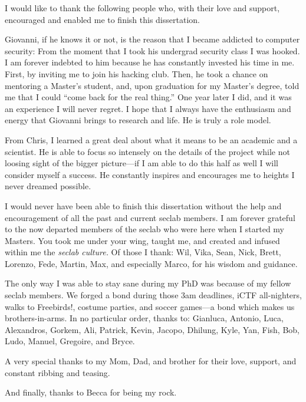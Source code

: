 \begin{acknowledgements}

I would like to thank the following people who, with their love and
support, encouraged and enabled me to finish this dissertation.

Giovanni, if he knows it or not, is the reason that I became addicted
to computer security: From the moment that I took his undergrad
security class I was hooked. I am forever indebted to him because he
has constantly invested his time in me. First, by inviting me to join
his hacking club. Then, he took a chance on mentoring a Master's
student, and, upon graduation for my Master's degree, told me that I
could ``come back for the real thing.'' One year later I did, and it
was an experience I will never regret. I hope that I always have the
enthusiasm and energy that Giovanni brings to research and life. He is
truly a role model.

From Chris, I learned a great deal about what it means to be an
academic and a scientist. He is able to focus so intensely on the
details of the project while not loosing sight of the bigger
picture---if I am able to do this half as well I will consider myself
a success. He constantly inspires and encourages me to heights I never
dreamed possible.

I would never have been able to finish this dissertation without the
help and encouragement of all the past and current seclab members. I
am forever grateful to the now departed members of the seclab who were
here when I started my Masters. You took me under your wing, taught
me, and created and infused within me the \emph{seclab culture.} Of
those I thank: Wil, Vika, Sean, Nick, Brett, Lorenzo, Fede, Martin,
Max, and especially Marco, for his wisdom and guidance.

The only way I was able to stay sane during my PhD was because of my
fellow sec\-lab members. We forged a bond during those 3am deadlines,
iCTF all-nighters, walks to Freebirds!, costume parties, and soccer
games---a bond which makes us brothers-in-arms. In no particular
order, thanks to: Gianluca, Antonio, Luca, Alexandros, Gorkem, Ali,
Patrick, Kevin, Jacopo, Dhilung, Kyle, Yan, Fish, Bob, Ludo, Manuel,
Gregoire, and Bryce.

A very special thanks to my Mom, Dad, and brother for their love,
support, and constant ribbing and teasing.

And finally, thanks to Becca for being my rock.

\end{acknowledgements}
